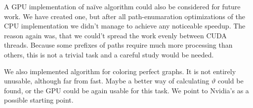 A GPU implementation of na\"ive algorithm could also be considered for future work. We have created one, but after all path-enumaration optimizations of the CPU implementation we didn't manage to achieve any noticeable speedup. The reason again was, that we could't spread the work evenly between CUDA threads. Because some prefixes of paths require much more processing than others, this is not a trivial task and a careful study would be needed.

We also implemented algorithm for coloring perfect graphs. It is not entirely unusable, although far from fast. Maybe a better way of calculating $\vartheta$ could be found, or the GPU could be again usable for this task. We point to Nvidia's \cite{cusolver} as a possible starting point.